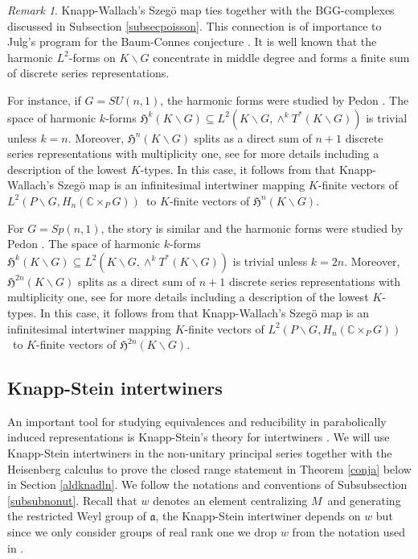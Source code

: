 \documentclass[a4paper,reqno]{amsart}
\numberwithin{equation}{section}
\def\C{\mathbb{C}}
\theoremstyle{definition}
\theoremstyle{remark}
\newtheorem{remark}[thm]{Remark}
\begin{document}
\begin{remark}
Knapp-Wallach's Szegö map ties together with the BGG-complexes discussed in Subsection \ref{subsecpoisson}. This connection is of importance to Julg's program for the Baum-Connes conjecture \cite{julgkasp,julghow}. It is well known that the harmonic $L^2$-forms on $K\backslash G$ concentrate in middle degree and forms a finite sum of discrete series representations. 

For instance, if $G=SU(n,1)$, the harmonic forms were studied by Pedon \cite{pedonsun}. The space of harmonic $k$-forms $\mathfrak{H}^k(K\backslash G)\subseteq L^2(K\backslash G,\wedge^k T^*( K\backslash G))$ is trivial unless $k=n$. Moreover, $\mathfrak{H}^{n}(K\backslash G)$ splits as a direct sum of $n+1$ discrete series representations with multiplicity one, see \cite[Theorem 3.3]{pedonsun} for more details including a description of the lowest $K$-types. In this case, it follows from \cite{julgkasp} that Knapp-Wallach's Szegö map is an infinitesimal intertwiner mapping $K$-finite vectors of $L^2(P\backslash G,H_{n}(\C\times_P G))$ to  $K$-finite vectors of $\mathfrak{H}^{n}(K\backslash G)$.

For $G=Sp(n,1)$, the story is similar and the harmonic forms were studied by Pedon \cite{pedonharm}. The space of harmonic $k$-forms $\mathfrak{H}^k(K\backslash G)\subseteq L^2(K\backslash G,\wedge^k T^*( K\backslash G))$ is trivial unless $k=2n$. Moreover, $\mathfrak{H}^{2n}(K\backslash G)$ splits as a direct sum of $n+1$ discrete series representations with multiplicity one, see \cite[Theorem 4.13]{pedonharm} for more details including a description of the lowest $K$-types. In this case, it follows from \cite{julghow} that Knapp-Wallach's Szegö map is an infinitesimal intertwiner mapping $K$-finite vectors of $L^2(P\backslash G,H_{n}(\C\times_P G))$ to  $K$-finite vectors of $\mathfrak{H}^{2n}(K\backslash G)$.
\end{remark}






\subsection{Knapp-Stein intertwiners}
\label{subsecks}

An important tool for studying equivalences and reducibility in parabolically induced representations is Knapp-Stein's theory for intertwiners \cite{knappstein}. We will use Knapp-Stein intertwiners in the non-unitary principal series together with the Heisenberg calculus to prove the closed range statement in Theorem \ref{conja} below in Section \ref{aldknadln}. We follow the notations and conventions of Subsubsection \ref{subsubnonut}. Recall that $w$ denotes an element centralizing $M$ and generating the restricted Weyl group of $\mathfrak{a}$, the Knapp-Stein intertwiner depends on $w$ but since we only consider groups of real rank one we drop $w$ from the notation used in \cite{knappstein}.
\end{document}
